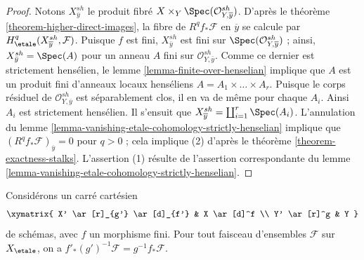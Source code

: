 \begin{proof}
Notons $X_{\overline{y}}^{sh}$ le produit fibr\'e
$X \times_Y \Spec(\mathcal{O}_{Y, \overline{y}}^{sh})$.
D'apr\`es le th\'eor\`eme \ref{theorem-higher-direct-images},
la fibre de $R^qf_*\mathcal{F}$ en $\overline{y}$ se calcule par
$H_\etale^q(X_{\overline{y}}^{sh}, \mathcal{F})$.
Puisque $f$ est fini, $X_{\bar y}^{sh}$ est fini sur
$\Spec(\mathcal{O}_{Y, \overline{y}}^{sh})$ ; ainsi,
$X_{\bar y}^{sh} = \Spec(A)$ pour un anneau $A$
fini sur $\mathcal{O}_{Y, \bar y}^{sh}$.
Comme ce dernier est strictement hens\'elien,
le lemme \ref{lemma-finite-over-henselian}
implique que $A$ est un produit fini d'anneaux locaux hens\'eliens
$A = A_1 \times \ldots \times A_r$. Puisque le corps r\'esiduel de
$\mathcal{O}_{Y, \overline{y}}^{sh}$ est s\'eparablement clos, il en va de
m\^eme pour chaque $A_i$. Ainsi $A_i$ est strictement hens\'elien.
Il s'ensuit que $X_{\overline{y}}^{sh} = \coprod_{i = 1}^r \Spec(A_i)$.
L'annulation du
lemme \ref{lemma-vanishing-etale-cohomology-strictly-henselian}
implique que $(R^qf_*\mathcal{F})_{\overline{y}} = 0$ pour $q > 0$ ;
cela implique (2) d'apr\`es le th\'eor\`eme \ref{theorem-exactness-stalks}.
L'assertion (1) r\'esulte de l'assertion correspondante du
lemme \ref{lemma-vanishing-etale-cohomology-strictly-henselian}.
\end{proof}

\begin{lemma}
\label{lemma-finite-pushforward-commutes-with-base-change}
Consid\'erons un carr\'e cart\'esien
$$
\xymatrix{
X' \ar[r]_{g'} \ar[d]_{f'} & X \ar[d]^f \\
Y' \ar[r]^g & Y
}
$$
de sch\'emas, avec $f$ un morphisme fini.
Pour tout faisceau d'ensembles $\mathcal{F}$ sur $X_\etale$, on a
$f'_*(g')^{-1}\mathcal{F} = g^{-1}f_*\mathcal{F}$.
\end{lemma}

